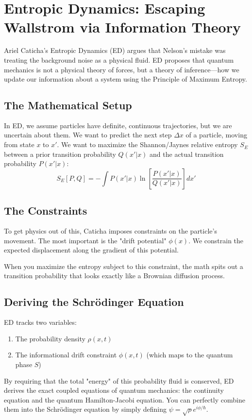 \documentclass[11pt]{article}
\begin{document}
\section{ Entropic Dynamics: Escaping Wallstrom via Information Theory}
Ariel Caticha’s Entropic Dynamics (ED) argues that Nelson’s mistake was
treating the background noise as a  physical fluid. ED proposes that
quantum mechanics is not a physical theory of forces, but a theory of 
inference---how we update our information about a system using the
Principle of Maximum Entropy.
\subsection{The Mathematical Setup}
In ED, we assume particles have definite, continuous trajectories, but we are uncertain about them. We want to predict the next step $\Delta x$ of a particle, moving from state $x$ to $x'$.
We want to maximize the Shannon/Jaynes relative entropy $S_E$ between a prior transition probability $Q(x'|x)$ and the actual transition probability $P(x'|x)$:
$$S_E[P, Q] = -\int P(x'|x) \ln\left[\frac{P(x'|x)}{Q(x'|x)}\right] dx'$$
\subsection{The Constraints}
To get physics out of this, Caticha imposes constraints on the particle's
movement. The most important is the "drift potential" $\phi(x)$. We
constrain the expected displacement along the gradient of this potential. 

When you maximize the entropy subject to this constraint, the math spits out a transition probability that looks exactly like a Brownian diffusion process. 
\subsection{Deriving the Schrödinger Equation}
ED tracks two variables:
\begin{enumerate}
   \item The probability density $\rho(x, t)$
       \item The informational drift constraint $\phi(x, t)$ (which maps to the quantum phase $S$)
\end{enumerate}

By requiring that the total "energy" of this probability fluid is
conserved, ED derives the exact coupled equations of quantum mechanics: 
the continuity equation and the quantum Hamilton-Jacobi equation. You can
perfectly combine them into the Schrödinger equation by simply defining
$\psi = \sqrt{\rho}e^{i\phi/\hbar}$.
\end{document}
